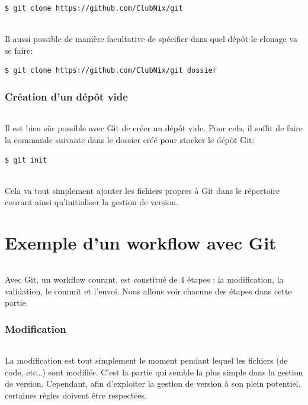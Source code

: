 \documentclass[french, a4paper, 12pt, titlepage]{article}
\begin{document}
\begin{lstlisting}
$ git clone https://github.com/ClubNix/git
\end{lstlisting}
\paragraph{}Il aussi possible de manière facultative de spécifier dans quel dépôt le clonage va se faire:
\begin{lstlisting}
$ git clone https://github.com/ClubNix/git dossier
\end{lstlisting}

\section{Création d'un dépôt vide}

\paragraph{} Il est bien sûr possible avec Git de créer un dépôt vide. Pour cela, il suffit de faire la commande suivante dans le dossier créé pour stocker le dépôt Git:

\begin{lstlisting}
$ git init
\end{lstlisting}

\paragraph{} Cela va tout simplement ajouter les fichiers propres à Git dans le répertoire courant ainsi qu'initialiser la gestion de version.

\newpage
\part{Exemple d'un workflow avec Git}
\paragraph{} Avec Git, un workflow courant, est constitué de 4 étapes : la modification, la validation, le commit et l'envoi. Nous allons voir chacune des étapes dans cette partie.
\section{Modification}
\paragraph{}La modification est tout simplement le moment pendant lequel les fichiers (de code, etc\dots) sont modifiés. C'est la partie qui semble la plus simple dans la gestion de version. Cependant, afin d'exploiter la gestion de version à son plein potentiel, certaines règles doivent être respectées.
\end{document}
